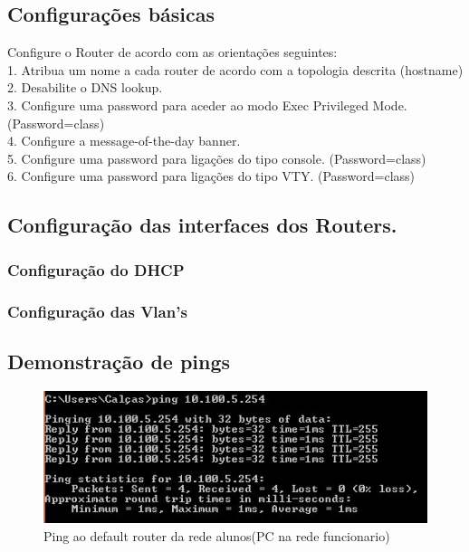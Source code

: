 \documentclass[a4paper,titlepage]{article}
\begin{document}
		\subsection{Configurações básicas}
			Configure o Router de acordo com as orientações seguintes:\\
			1. Atribua um nome a cada router de acordo com a topologia descrita (hostname)\\
			2. Desabilite o DNS lookup.\\
			3. Configure uma password para aceder ao modo Exec Privileged Mode.
			(Password=class)\\
			4. Configure a message-of-the-day banner.\\
			5. Configure uma password para ligações do tipo console. (Password=class)\\
			6. Configure uma password para ligações do tipo VTY. (Password=class)\\
		
			
		\subsection{Configuração das interfaces dos Routers.}
			
			\subsubsection{Configuração do DHCP}
				
			\subsubsection{Configuração das Vlan's}
				
		\subsection{Demonstração de pings}
			\begin{figure}[H]
					\centering
					\includegraphics[width=\linewidth]{ping_rede_funcionario.jpg}
					\caption{Ping ao default router da rede alunos(PC na rede funcionario)}
			\end{figure}
\end{document}
